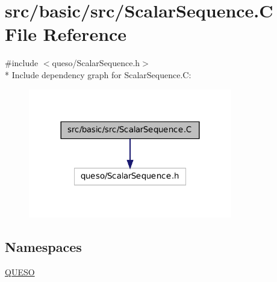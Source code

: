 \hypertarget{_scalar_sequence_8_c}{\section{src/basic/src/\-Scalar\-Sequence.C File Reference}
\label{_scalar_sequence_8_c}
}
{\ttfamily \#include $<$queso/\-Scalar\-Sequence.\-h$>$}\\*
Include dependency graph for Scalar\-Sequence.\-C\-:
\nopagebreak
\begin{figure}[H]
\begin{center}
\leavevmode
\includegraphics[width=252pt]{_scalar_sequence_8_c__incl}
\end{center}
\end{figure}
\subsection*{Namespaces}
\begin{DoxyCompactItemize}
\item 
\hyperlink{namespace_q_u_e_s_o}{Q\-U\-E\-S\-O}
\end{DoxyCompactItemize}
